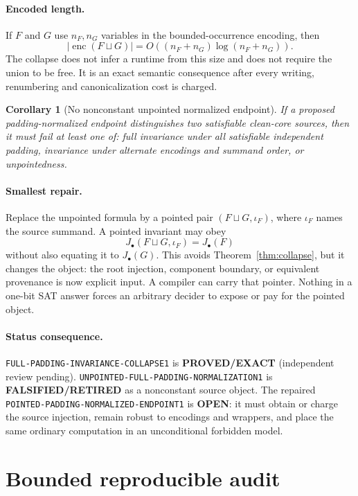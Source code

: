 \documentclass[11pt]{article}
\newtheorem{corollary}{Corollary}
\newcommand{\OPEN}{\textbf{OPEN}}
\newcommand{\EXACT}{\textbf{PROVED/EXACT}}
\newcommand{\RETIRED}{\textbf{FALSIFIED/RETIRED}}
\begin{document}
\paragraph{Encoded length.}
If \(F\) and \(G\) use \(n_F,n_G\) variables in the bounded-occurrence
encoding, then
\[
 |\operatorname{enc}(F\sqcup G)|
 =O\!\left((n_F+n_G)\log(n_F+n_G)\right).
\]
The collapse does not infer a runtime from this size and does not require the
union to be free.  It is an exact semantic consequence after every writing,
renumbering and canonicalization cost is charged.

\begin{corollary}[No nonconstant unpointed normalized endpoint]
If a proposed padding-normalized endpoint distinguishes two satisfiable
clean-core sources, then it must fail at least one of: full invariance under
all satisfiable independent padding, invariance under alternate encodings and
summand order, or unpointedness.
\end{corollary}

\paragraph{Smallest repair.}
Replace the unpointed formula by a pointed pair
\((F\sqcup G,\iota_F)\), where \(\iota_F\) names the source summand.  A
pointed invariant may obey
\[
 J_\bullet(F\sqcup G,\iota_F)=J_\bullet(F)
\]
without also equating it to \(J_\bullet(G)\).  This avoids
Theorem~\ref{thm:collapse}, but it changes the object: the root injection,
component boundary, or equivalent provenance is now explicit input.  A
compiler can carry that pointer.  Nothing in a one-bit SAT answer forces an
arbitrary decider to expose or pay for the pointed object.

\paragraph{Status consequence.}
\texttt{FULL-PADDING-INVARIANCE-COLLAPSE1} is \EXACT{} (independent review
pending).  \texttt{UNPOINTED-FULL-PADDING-NORMALIZATION1} is \RETIRED{} as a
nonconstant source object.  The repaired
\texttt{POINTED-PADDING-NORMALIZED-ENDPOINT1} is \OPEN: it must obtain or
charge the source injection, remain robust to encodings and wrappers, and
place the same ordinary computation in an unconditional forbidden model.

\section{Bounded reproducible audit}
\end{document}
